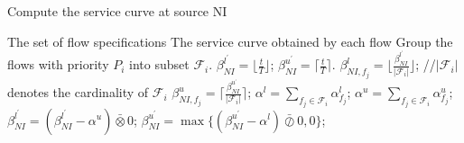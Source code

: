 \documentclass[10pt,journal]{IEEEtran}
\begin{document}
\begin{algorithm}
\caption{Compute the service curve at source NI}\label{alg:scatni}
\begin{algorithmic}[1]
\Require The set of flow specifications
\Ensure The service curve obtained by each flow
\State Group the flows with priority $P_i$ into subset $\mathcal{F}_i$.
\State $\beta_{NI}^{l^\prime}=\lfloor\frac{t}{T}\rfloor$; $\beta_{NI}^{u^\prime}=\lceil\frac{t}{T}\rceil$.
        \State $\beta_{NI,f_j}^l=\lfloor\frac{\beta_{NI}^{l^\prime}}{|\mathcal{F}_i|}\rfloor$; //$|\mathcal{F}_i|$ denotes the cardinality of $\mathcal{F}_i$
        \State $\beta_{NI,f_j}^u=\lceil\frac{\beta_{NI}^{u^\prime}}{|\mathcal{F}_i|}\rceil$;
    \EndFor
    \State $\alpha^l=\sum_{f_j\in \mathcal{F}_i}\alpha^l_{f_j}$; $\alpha^u=\sum_{f_j\in \mathcal{F}_i}\alpha^u_{f_j}$;
    \State $\beta_{NI}^{l^\prime}=(\beta_{NI}^{l^\prime}-\alpha^u)\bar{\otimes}0$; $\beta_{NI}^{u^\prime}=\max\{(\beta_{NI}^{u^\prime}-\alpha^l)\bar{\oslash}0,0\}$;
\EndFor
\end{algorithmic}
\end{algorithm}
\end{document}
